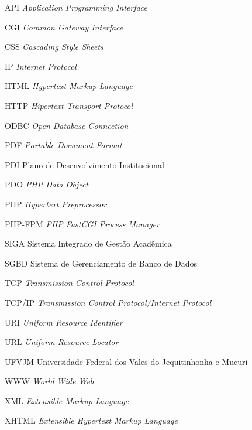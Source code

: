 \begin{siglas}
  \item[API] \textit{Application Programming Interface}
  \item[CGI] \textit{Common Gateway Interface}
  \item[CSS] \textit{Cascading Style Sheets}
  \item[IP] \textit{Internet Protocol}
  \item[HTML] \textit{Hypertext Markup Language}
  \item[HTTP] \textit{Hipertext Transport Protocol}
  \item[ODBC] \textit{Open Database Connection}
  \item[PDF] \textit{Portable Document Format}
  \item[PDI] Plano de Desenvolvimento Institucional
  \item[PDO] \textit{PHP Data Object}
  \item[PHP] \textit{Hypertext Preprocessor}
  \item[PHP-FPM] \textit{PHP FastCGI Process Manager}
  \item[SIGA] Sistema Integrado de Gestão Acadêmica
  \item[SGBD] Sistema de Gerenciamento de Banco de Dados
  \item[TCP] \textit{Transmission Control Protocol}
  \item[TCP/IP] \textit{Transmission Control Protocol/Internet Protocol	}
  \item[URI] \textit{Uniform Resource Identifier}
  \item[URL] \textit{Uniform Resource Locator}
  \item[UFVJM] Universidade Federal dos Vales do Jequitinhonha e Mucuri
  \item[WWW] \textit{World Wide Web}
  \item[XML] \textit{Extensible Markup Language}
  \item[XHTML] \textit{Extensible Hypertext Markup Language}
\end{siglas}